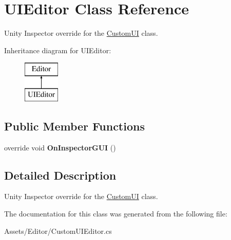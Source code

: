 \hypertarget{class_u_i_editor}{}\section{U\+I\+Editor Class Reference}
\label{class_u_i_editor}


Unity Inspector override for the \hyperlink{class_custom_u_i}{Custom\+U\+I} class.  


Inheritance diagram for U\+I\+Editor\+:\begin{figure}[H]
\begin{center}
\leavevmode
\includegraphics[height=2.000000cm]{class_u_i_editor}
\end{center}
\end{figure}
\subsection*{Public Member Functions}
\begin{DoxyCompactItemize}
\item 
\hypertarget{class_u_i_editor_a32f8729ed297da5aa3440dc1eeea5981}{}override void {\bfseries On\+Inspector\+G\+U\+I} ()\label{class_u_i_editor_a32f8729ed297da5aa3440dc1eeea5981}

\end{DoxyCompactItemize}


\subsection{Detailed Description}
Unity Inspector override for the \hyperlink{class_custom_u_i}{Custom\+U\+I} class. 



The documentation for this class was generated from the following file\+:\begin{DoxyCompactItemize}
\item 
Assets/\+Editor/Custom\+U\+I\+Editor.\+cs\end{DoxyCompactItemize}
